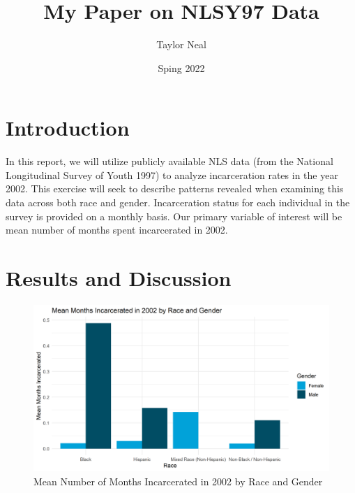\documentclass{article}
\author{Taylor Neal}
\title{My Paper on NLSY97 Data}
\date{Sping 2022}
\begin{document}
\maketitle

\section{Introduction}

In this report, we will utilize publicly available NLS data (from the National Longitudinal Survey of Youth 1997) to analyze incarceration rates in the year 2002. This exercise will seek to describe patterns revealed when examining this data across both race and gender. Incarceration status for each individual in the survey is provided on a monthly basis. Our primary variable of interest will be mean number of months spent incarcerated in 2002.

\newpage

\section{Results and Discussion}


\begin{figure}[H]
    \begin{center}
        \includegraphics[width=.85\textwidth]{incarceration_by_racegender}
    \end{center}
    \caption{Mean Number of Months Incarcerated in 2002 by Race and Gender}
    \label{fig:graph}
\end{figure}
\end{document}

